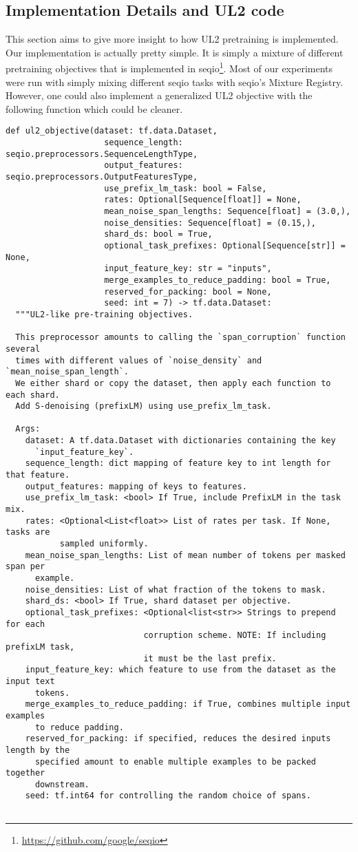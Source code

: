 \documentclass[10pt]{article}
\begin{document}
\subsection{Implementation Details and UL2 code}
This section aims to give more insight to how UL2 pretraining is implemented. Our implementation is actually pretty simple. It is simply a mixture of different pretraining objectives that is implemented in seqio\footnote{\url{https://github.com/google/seqio}}. Most of our experiments were run with simply mixing different seqio tasks with seqio's Mixture Registry. However, one could also implement a generalized UL2 objective with the following function which could be cleaner.
\begin{lstlisting}
def ul2_objective(dataset: tf.data.Dataset,
                    sequence_length: seqio.preprocessors.SequenceLengthType,
                    output_features: seqio.preprocessors.OutputFeaturesType,
                    use_prefix_lm_task: bool = False,
                    rates: Optional[Sequence[float]] = None,
                    mean_noise_span_lengths: Sequence[float] = (3.0,),
                    noise_densities: Sequence[float] = (0.15,),
                    shard_ds: bool = True,
                    optional_task_prefixes: Optional[Sequence[str]] = None,
                    input_feature_key: str = "inputs",
                    merge_examples_to_reduce_padding: bool = True,
                    reserved_for_packing: bool = None,
                    seed: int = 7) -> tf.data.Dataset:
  """UL2-like pre-training objectives.

  This preprocessor amounts to calling the `span_corruption` function several
  times with different values of `noise_density` and `mean_noise_span_length`.
  We either shard or copy the dataset, then apply each function to each shard.
  Add S-denoising (prefixLM) using use_prefix_lm_task. 

  Args:
    dataset: A tf.data.Dataset with dictionaries containing the key
      `input_feature_key`.
    sequence_length: dict mapping of feature key to int length for that feature.
    output_features: mapping of keys to features.
    use_prefix_lm_task: <bool> If True, include PrefixLM in the task mix.
    rates: <Optional<List<float>> List of rates per task. If None, tasks are
           sampled uniformly.
    mean_noise_span_lengths: List of mean number of tokens per masked span per
      example.
    noise_densities: List of what fraction of the tokens to mask.
    shard_ds: <bool> If True, shard dataset per objective.
    optional_task_prefixes: <Optional<list<str>> Strings to prepend for each
                            corruption scheme. NOTE: If including prefixLM task,
                            it must be the last prefix.
    input_feature_key: which feature to use from the dataset as the input text
      tokens.
    merge_examples_to_reduce_padding: if True, combines multiple input examples
      to reduce padding.
    reserved_for_packing: if specified, reduces the desired inputs length by the
      specified amount to enable multiple examples to be packed together
      downstream.
    seed: tf.int64 for controlling the random choice of spans.


\end{lstlisting}
\end{document}

